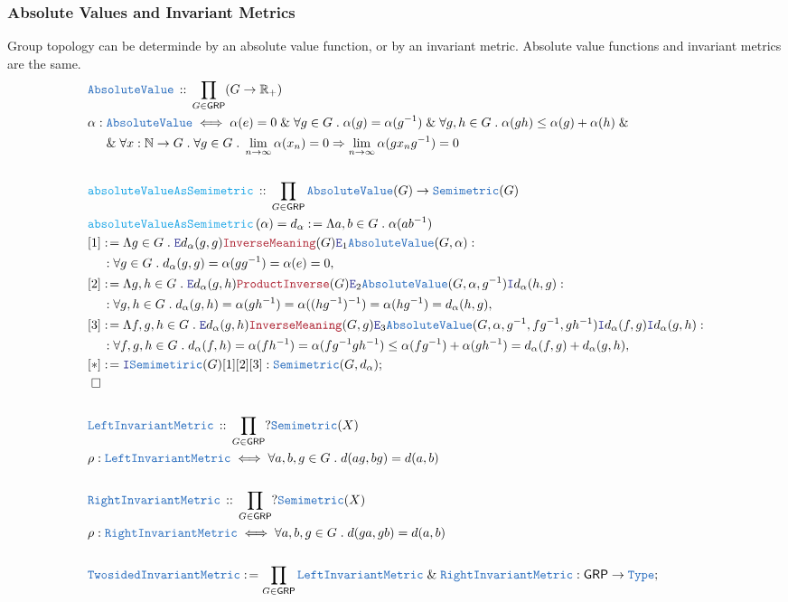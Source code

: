 \documentclass[12pt]{scrartcl}
\newcommand{\TYPE}[1]{\textcolor{NavyBlue}{\mathtt{#1}}}
\newcommand{\FUNC}[1]{\textcolor{Cerulean}{\mathtt{#1}}}
\newcommand{\LOGIC}[1]{\textcolor{Blue}{\mathtt{#1}}}
\newcommand{\THM}[1]{\textcolor{Maroon}{\mathtt{#1}}}
\renewcommand{\.}{\; . \;}
\newcommand{\de}{: \kern 0.1pc =}
\newcommand{\Act}[1]{\left( #1 \right)}
\newcommand{\DeclareType}[2]{& \TYPE{#1} \, :: \, #2 \\}
\newcommand{\DefineType}[3]{& #1 : \TYPE{#2} \iff #3 \\}
\newcommand{\DeclareFunc}[2]{& \FUNC{#1} \, :: \, #2 \\}
\newcommand{\DefineNamedFunc}[4]{&  \FUNC{#1}\Act{#2} = #3 \de #4 \\}
\newcommand{\NewLine}{\\ & \kern 1pc}
\newcommand{\Page}[1]{ \begin{align*} #1 \end{align*}   }
\renewcommand{\And}{\; \& \;}
\newcommand{\Imply}{\Rightarrow}
\newcommand{\Type}{\TYPE{Type}}
\newcommand{\Reals}{\mathbb{R} }
\newcommand{\Nat}{\mathbb{N} }
\newcommand{\Say}[3]{& #1 \de #2 : #3, \\}
\newcommand{\Conclude}[3]{& #1 \de #2 : #3; \\}
\newcommand{\Intro}{\LOGIC{I}}
\newcommand{\Elim}{\LOGIC{E}}
\newcommand{\QED}{\; \square}
\newcommand{\EndProof}{& \QED \\}
\newcommand{\GRP}{\mathsf{GRP}}
\newcommand{\LIM}{\TYPE{LeftInvariantMetric}}
\newcommand{\RIM}{\TYPE{RightInvariantMetric}}
\newcommand{\TIM}{\TYPE{TwosidedInvariantMetric}}
\begin{document}
\subsubsection{Absolute Values and Invariant Metrics}
Group topology can be determinde by an absolute value function, or by an invariant metric.
Absolute value functions and invariant metrics are the same. 
\Page{
	\DeclareType{AbsoluteValue}
	{
		\prod_{G \in \GRP} (G \to \Reals_{+})
	}
	\DefineType{\alpha}{AbsoluteValue}
	{
		\alpha(e) = 0 
		\And
		\forall g \in G \.
		\alpha(g) = \alpha(g^{-1})
		\And
		\forall g,h \in G \.
		\alpha(gh) \le \alpha(g) + \alpha(h)
		\And
		\NewLine		
		\And
		\forall x : \Nat \to G \.
		\forall g \in G \.
		\lim_{n \to \infty} \alpha(x_n) = 0
		\Imply
		\lim_{n \to \infty} \alpha(gx_ng^{-1}) = 0
	}
	\\
	\DeclareFunc{absoluteValueAsSemimetric}
	{
		\prod_{G \in \GRP} 
		\TYPE{AbsoluteValue}(G)
		\to
		\TYPE{Semimetric}(G)
	}
	\DefineNamedFunc{absoluteValueAsSemimetric}{\alpha}{d_\alpha}
	{
		\Lambda a,b \in G \. \alpha(ab^{-1})
	}
	\Say{[1]}{
		\Lambda g \in G \. 
		\Elim d_\alpha(g,g)
		\THM{InverseMeaning}(G)
		\Elim_1 \TYPE{AbsoluteValue}(G,\alpha)
	}
	{
		\NewLine :		
		\forall g \in G \. 
		d_\alpha(g,g) = 
		\alpha(gg^{-1}) =
		\alpha(e) =
		0
	}
	\Say{[2]}{
		\Lambda g,h \in G \. 
		\Elim d_\alpha(g,h) 
		\THM{ProductInverse}(G)
		\Elim_2 \TYPE{AbsoluteValue}(G,\alpha,g^{-1})
		\Intro d_\alpha(h,g)
	}
	{
		\NewLine :		
		\forall g,h \in G \. 
		d_\alpha(g,h) = 
		\alpha(gh^{-1}) =
		\alpha((hg^{-1})^{-1}) =
		\alpha(hg^{-1})=
		d_\alpha(h,g)
	}
	\Say{[3]}{
		\Lambda f,g,h \in G \. 
		\Elim d_\alpha(g,h) 
		\THM{InverseMeaning}(G,g)
		\Elim_3 \TYPE{AbsoluteValue}(G,\alpha,g^{-1},fg^{-1},gh^{-1})
		\Intro d_\alpha(f,g)
		\Intro d_\alpha(g,h)
	}
	{
		\NewLine :		
		\forall f,g,h \in G \. 
		d_\alpha(f,h) = 
		\alpha(fh^{-1}) =
		\alpha(fg^{-1}gh^{-1}) \le 
		\alpha(fg^{-1}) + \alpha(gh^{-1})=
		d_\alpha(f,g) + d_\alpha(g,h)
	}
	\Conclude{[*]}{\Intro \TYPE{Semimetiric}(G)[1][2][3]}
	{
		\TYPE{Semimetric}(G,d_\alpha)
	}
	\EndProof
	\\
	\DeclareType{\LIM}{\prod_{G \in \GRP} ?\TYPE{Semimetric}(X)}
	\DefineType{\rho}{\LIM}{\forall a,b,g \in G \. d(ag,bg) = d(a,b)}
	\\
	\DeclareType{\RIM}{\prod_{G \in \GRP} ?\TYPE{Semimetric}(X)}
	\DefineType{\rho}{\RIM}{\forall a,b,g \in G \. d(ga,gb) = d(a,b)}
	\\
	\Conclude{\TIM}{\prod_{G \in \GRP} \LIM \And \RIM}{\GRP \to \Type}
	\\
}
\end{document}
